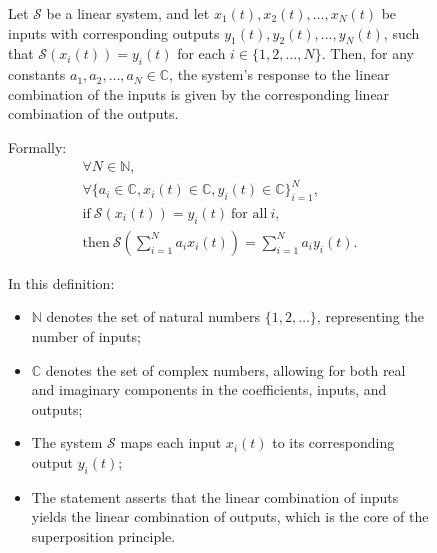 \documentclass[../notes-main.tex]{subfiles}
\begin{document}
\begin{figure}[H]
    \centering
    \begin{mdframed}
        
            Let \(\mathcal{S}\) be a linear system, and let \(x_1(t), x_2(t), \dots, x_N(t)\) be inputs with corresponding outputs \(y_1(t), y_2(t), \dots, y_N(t)\), such that \(\mathcal{S}(x_i(t)) = y_i(t)\) for each \(i \in \{1, 2, \dots, N\}\). Then, for any constants \(a_1, a_2, \dots, a_N \in \mathbb{C}\), the system's response to the linear combination of the inputs is given by the corresponding linear combination of the outputs.

            Formally:
            \begin{gather}
                \forall N \in \mathbb{N}, \\
                \forall \{a_i \in \mathbb{C}, x_i(t) \in \mathbb{C}, y_i(t) \in \mathbb{C}\}_{i=1}^N, \\
                \text{if} \ \mathcal{S}(x_i(t)) = y_i(t) \ \text{for all} \ i, \\
                \text{then} \ \mathcal{S}\left(\sum_{i=1}^{N} a_i x_i(t)\right) = \sum_{i=1}^{N} a_i y_i(t).
                \label{eq:linear-system-superposition-nerd}
            \end{gather}

            In this definition:
            \begin{itemize}
                \item \(\mathbb{N}\) denotes the set of natural numbers \(\{1,2,\dots\}\), representing the number of inputs;
                \item \(\mathbb{C}\) denotes the set of complex numbers, allowing for both real and imaginary components in the coefficients, inputs, and outputs;
                \item The system \(\mathcal{S}\) maps each input \(x_i(t)\) to its corresponding output \(y_i(t)\);
                \item The statement asserts that the linear combination of inputs yields the linear combination of outputs, which is the core of the superposition principle.
            \end{itemize}
        
    \end{mdframed}
    \vspace{-1em}\label{fig:linear-system-superposition-nerd-1}
\end{figure}
\end{document}
